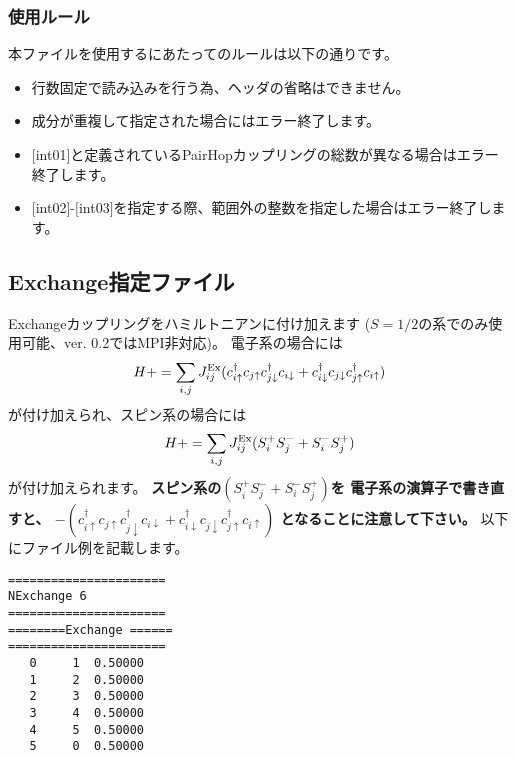 \subsubsection{使用ルール}
本ファイルを使用するにあたってのルールは以下の通りです。
\begin{itemize}
\item 行数固定で読み込みを行う為、ヘッダの省略はできません。
\item 成分が重複して指定された場合にはエラー終了します。
\item $[$int01$]$と定義されているPairHopカップリングの総数が異なる場合はエラー終了します。
\item $[$int02$]$-$[$int03$]$を指定する際、範囲外の整数を指定した場合はエラー終了します。
\end{itemize}

\newpage
\subsection{Exchange指定ファイル}
Exchangeカップリングをハミルトニアンに付け加えます{ ($S=1/2$の系でのみ使用可能、ver. 0.2ではMPI非対応)}。
電子系の場合には
\begin{equation}
H+=\sum_{i,j}J_{ij}^{\rm Ex} (c_ {i \uparrow}^{\dag}c_{j\uparrow}c_{j \downarrow}^{\dag}c_{i  \downarrow}+c_ {i \downarrow}^{\dag}c_{j\downarrow}c_{j \uparrow}^{\dag}c_{i  \uparrow})
\end{equation}
が付け加えられ、スピン系の場合には
\begin{equation}
H+=\sum_{i,j}J_{ij}^{\rm Ex} (S_i^+S_j^-+S_i^-S_j^+)
\end{equation}
が付け加えられます。
{\bf スピン系の$(S_i^+S_j^-+S_i^-S_j^+)$を
電子系の演算子で書き直すと、
$-(c_ {i \uparrow}^{\dag}c_{j\uparrow}c_{j \downarrow}^{\dag}c_{i  \downarrow}+c_ {i \downarrow}^{\dag}c_{j\downarrow}c_{j \uparrow}^{\dag}c_{i  \uparrow})$
となることに注意して下さい。}
以下にファイル例を記載します。

\begin{minipage}{12.5cm}
\begin{screen}
\begin{verbatim}
====================== 
NExchange 6  
====================== 
========Exchange ====== 
====================== 
   0     1  0.50000
   1     2  0.50000
   2     3  0.50000
   3     4  0.50000
   4     5  0.50000
   5     0  0.50000
\end{verbatim}
\end{screen}
\end{minipage}

